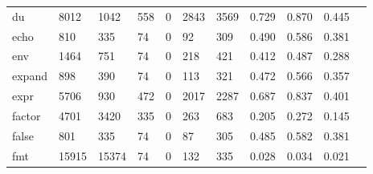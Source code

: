 \begin{longtable}{lp{1.10cm}p{1.10cm}p{1.10cm}p{1.10cm}p{1.10cm}p{1.10cm}p{1.10cm}p{1.10cm}p{1.10cm}p{1.10cm}}
du        &                   8012 &                               1042 &                               558 &                                0 &                              2843 &                            3569 &                             0.729 &                                 0.870 &                               0.445 \\
echo      &                    810 &                                335 &                                74 &                                0 &                                92 &                             309 &                             0.490 &                                 0.586 &                               0.381 \\
env       &                   1464 &                                751 &                                74 &                                0 &                               218 &                             421 &                             0.412 &                                 0.487 &                               0.288 \\
expand    &                    898 &                                390 &                                74 &                                0 &                               113 &                             321 &                             0.472 &                                 0.566 &                               0.357 \\
expr      &                   5706 &                                930 &                               472 &                                0 &                              2017 &                            2287 &                             0.687 &                                 0.837 &                               0.401 \\
factor    &                   4701 &                               3420 &                               335 &                                0 &                               263 &                             683 &                             0.205 &                                 0.272 &                               0.145 \\
false     &                    801 &                                335 &                                74 &                                0 &                                87 &                             305 &                             0.485 &                                 0.582 &                               0.381 \\
fmt       &                  15915 &                              15374 &                                74 &                                0 &                               132 &                             335 &                             0.028 &                                 0.034 &                               0.021 \\

\end{longtable}
